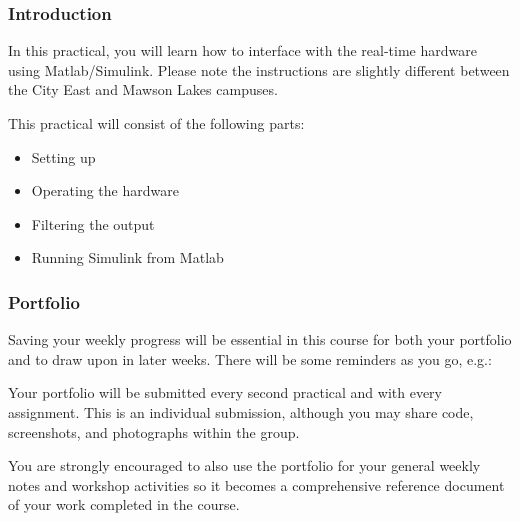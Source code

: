 \documentclass[8pt]{beamer-control}
\begin{document}

\begin{frame}
\frametitle{Introduction}
In this practical, you will learn how to interface with the real-time hardware using Matlab/Simulink.
Please note the instructions are slightly different between the City East and Mawson Lakes campuses.

\vfill

This practical will consist of the following parts:
\begin{itemize}
\item Setting up
\item Operating the hardware
\item Filtering the output
\item Running Simulink from Matlab
\end{itemize}
\end{frame}

\begin{frame}
\frametitle{Portfolio}
Saving your weekly progress will be essential in this course for both your portfolio and to draw upon in later weeks. There will be some reminders as you go, e.g.:

Your portfolio will be submitted every second practical and with every assignment. This is an individual submission, although you may share code, screenshots, and photographs within the group.

You are strongly encouraged to also use the portfolio for your general weekly notes and workshop activities so it becomes a comprehensive reference document of your work completed in the course.
\end{frame}


\end{document}
